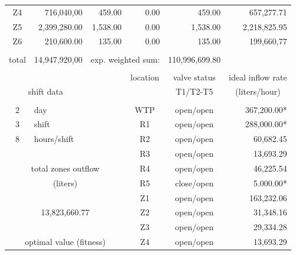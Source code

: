 \documentclass{singlecol}
\theoremstyle{TH}{
\newtheorem{lemma}{Lemma}
\newtheorem{theorem}[lemma]{Theorem}
\newtheorem{corrolary}[lemma]{Corrolary}
\newtheorem{conjecture}[lemma]{Conjecture}
\newtheorem{proposition}[lemma]{Proposition}
\newtheorem{claim}[lemma]{Claim}
\newtheorem{stheorem}[lemma]{Wrong Theorem}
\newtheorem{algorithm}{Algorithm}
}
\theoremstyle{THrm}{
\newtheorem{definition}{Definition}[section]
\newtheorem{question}{Question}[section]
\newtheorem{remark}{Remark}
\newtheorem{scheme}{Scheme}
}
\theoremstyle{THhit}{
\newtheorem{case}{Case}[section]
}
\begin{document}
\begin{table}[t]
\begin{center}
\begin{small}
\begin{tabular}{ c r r r r r }
	    Z4    &    716,040,00 &       459.00 & 0.00 &        459.00 &    657,277.71 \\
	    Z5    &  2,399,280.00 &     1,538.00 & 0.00 &      1,538.00 &  2,218,825.95 \\
	    Z6    &    210,600.00 &       135.00 & 0.00 &        135.00 &    199,660,77 \\
	    \\
	    total & 14,947,920,00 & \multicolumn{2}{r}{exp. weighted sum:} & 110,996,699.80 & \\
		   \\
		&  &      &  \multicolumn{1}{c}{location}    & \multicolumn{1}{c}{valve status}         & \multicolumn{1}{c}{ideal inflow rate}   \\
		\multicolumn{2}{c}{shift data}     &   &      & \multicolumn{1}{c}{T1/T2-T5}        & \multicolumn{1}{c}{(liters/hour)}  \\
		   \\
		2   &  \multicolumn{1}{l}{day}   &              	& \multicolumn{1}{c}{WTP}    & \multicolumn{1}{c}{open/open} &  367,200.00* \\
		3   &  \multicolumn{1}{l}{shift}  &         		& \multicolumn{1}{c}{R1}     & \multicolumn{1}{c}{open/open} &  288,000.00*  \\
		8   &  \multicolumn{1}{l}{hours/shift}        &     & \multicolumn{1}{c}{R2}     & \multicolumn{1}{c}{open/open} &   60,682.45  \\
	   &      &              								& \multicolumn{1}{c}{R3}     & \multicolumn{1}{c}{open/open} &   13,693.29  \\
	   \multicolumn{3}{c}{total zones outflow}              & \multicolumn{1}{c}{R4}     & \multicolumn{1}{c}{open/open} &   46,225.54  \\
	   \multicolumn{3}{c}{(liters)}              		    & \multicolumn{1}{c}{R5}     & \multicolumn{1}{c}{close/open} &    5.000.00* \\
	   &      &              								& \multicolumn{1}{c}{Z1}     & \multicolumn{1}{c}{open/open} &  163,232.06  \\
	   \multicolumn{3}{c}{13,823,660.77}              		& \multicolumn{1}{c}{Z2}     & \multicolumn{1}{c}{open/open} &   31,348.16  \\
	      &              &              					& \multicolumn{1}{c}{Z3}     & \multicolumn{1}{c}{open/open} &   29,334.28  \\
	   \multicolumn{3}{c}{optimal value (fitness)}          & \multicolumn{1}{c}{Z4}     & \multicolumn{1}{c}{open/open} &   13,693.29  \\

\end{tabular}
\end{small}
\end{center}
\end{table}
\end{document}
